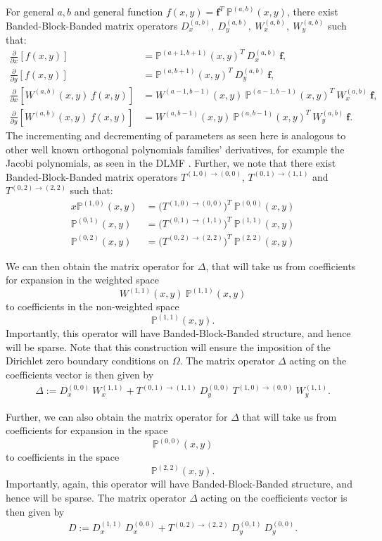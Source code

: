 \documentclass[11pt, oneside]{article}   	%
\newcommand{\bigP}{\mathbb{P}}
\newcommand{\Wab}{{W^{(a,b)}}}
\newcommand{\bigPab}{\bigP^{(a,b)}}
\newcommand{\Wii}{W^{(1,1)}}
\newcommand{\bigPii}{{\mathbb{P}^{(1,1)}}}
\newcommand{\bigPoo}{{\mathbb{P}^{(0,0)}}}
\newcommand{\dx}{\frac{\partial}{\partial x}}
\newcommand{\dy}{\frac{\partial}{\partial y}}
\begin{document}
For general \(a,b\) and general function \(f(x,y) = \mathbf{f}^T \: \bigPab(x,y)\), there exist Banded-Block-Banded matrix operators \(D_x^{(a,b)}, \: D_y^{(a,b)}, \: W_x^{(a,b)}, \: W_y^{(a,b)}\) such that:
\begin{align}
\dx[f(x,y)] &= \bigP^{(a+1,b+1)}(x,y)^T \: D_x^{(a,b)} \: \mathbf{f}, \\
\dy[f(x,y)] &= \bigP^{(a,b+1)}(x,y)^T \: D_y^{(a,b)} \: \mathbf{f}, \\
\dx[\Wab(x,y) \: f(x,y)] &= W^{(a-1,b-1)}(x,y) \: \bigP^{(a-1,b-1)}(x,y)^T \: W_x^{(a,b)} \: \mathbf{f}, \\
\dy[\Wab(x,y) \: f(x,y)] &= W^{(a,b-1)}(x,y) \: \bigP^{(a,b-1)}(x,y)^T \: W_y^{(a,b)} \: \mathbf{f}.
\end{align}
The incrementing and decrementing of parameters as seen here is analogous to other well known orthogonal polynomials families' derivatives, for example the Jacobi polynomials, as seen in the DLMF \cite{DLMFDerivatives}.
Further, we note that there exist Banded-Block-Banded matrix operators \(T^{(1,0)\to(0,0)}\), \(T^{(0,1)\to(1,1)}\) and $T^{(0,2)\to(2,2)}$ such that:
\begin{align}
x \bigP^{(1,0)}(x,y) &= \Big(T^{(1,0)\to(0,0)} \Big)^T \: \bigP^{(0,0)}(x,y) \\
\bigP^{(0,1)}(x,y) &= \Big(T^{(0,1)\to(1,1)} \Big)^T \: \bigP^{(1,1)}(x,y) \\
\bigP^{(0,2)}(x,y) &= \Big(T^{(0,2)\to(2,2)} \Big)^T \: \bigP^{(2,2)}(x,y)
\end{align}

We can then obtain the matrix operator for \(\Delta\), that will take us from coefficients for expansion in the weighted space
\[
\Wii(x,y) \: \bigPii(x,y)
\]
to coefficients in the non-weighted space
\[
\bigPii(x,y).
\]
Importantly, this operator will have Banded-Block-Banded structure, and hence will be sparse. Note that this construction will ensure the imposition of the Dirichlet zero boundary conditions on $\Omega$. The matrix operator \(\Delta\) acting on the coefficients vector is then given by
\begin{align}
    \Delta := D_x^{(0,0)} \: W_x^{(1,1)} + T^{(0,1)\to(1,1)} \: D_y^{(0,0)} \: T^{(1,0)\to(0,0)} \: W_y^{(1,1)}.
\end{align}

Further, we can also obtain the matrix operator for \(\Delta\) that will take us from coefficients for expansion in the space
\[
\bigPoo(x,y)
\]
to coefficients in the space
\[
\bigP^{(2,2)}(x,y).
\]
Importantly, again, this operator will have Banded-Block-Banded structure, and hence will be sparse. The matrix operator \(\Delta\) acting on the coefficients vector is then given by
\begin{align}
    D := D_x^{(1,1)} \: D_x^{(0,0)} + T^{(0,2)\to(2,2)} \: D_y^{(0,1)} \: D_y^{(0,0)}.
\end{align}
\end{document}
